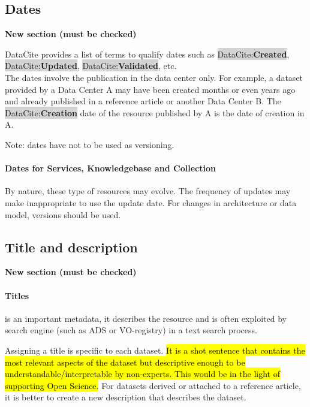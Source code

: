 \documentclass[11pt,a4paper]{ivoa}
\newcommand{\dataciteterm}[1]{\colorbox{lightgray}{DataCite:\textbf{#1}}}
\begin{document}
\subsection{Dates}
\label{sec:dates}
\textbf{\color{red}New section (must be checked)}


DataCite provides a list of terms to qualify dates such as \dataciteterm{Created}, \dataciteterm{Updated}, \dataciteterm{Validated}, etc.\\

The dates involve the publication in the data center only.
For example, a dataset provided by a Data Center A may have been created months or even years ago and already published in a reference article or another Data Center B. The \dataciteterm{Creation} date of the resource published by A is the date of creation in A.

Note: dates have not to be used as versioning.

\paragraph{Dates for Services, Knowledgebase and Collection}
By nature, these type of resources may evolve. The frequency of updates may make inappropriate to use the update date. For changes in architecture or data model, versions should be used.


\subsection{Title and description}
\label{sec:title}
\textbf{\color{red}New section (must be checked)}

\paragraph{Titles} is an important metadata, it describes the resource and is often exploited by search engine (such as ADS or VO-registry) in a text search process.


Assigning a title is specific to each dataset. 
\hl{It is a shot sentence that contains the most relevant aspects of the dataset but descriptive enough to be understandable/interpretable by non-experts. This would be in the light of supporting Open Science.}
For datasets derived or attached to a reference article, it is better to create a new description that describes the dataset.\\
\end{document}
